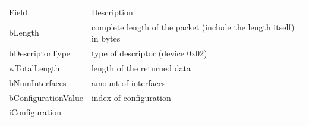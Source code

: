 \begin{longtable}[]{@{}ll@{}}
\toprule
\begin{minipage}[t]{0.47\columnwidth}\raggedright\strut
{Field}
\strut\end{minipage} &
\begin{minipage}[t]{0.47\columnwidth}\raggedright\strut
{Description}
\strut\end{minipage}\tabularnewline
\begin{minipage}[t]{0.47\columnwidth}\raggedright\strut
{bLength}
\strut\end{minipage} &
\begin{minipage}[t]{0.47\columnwidth}\raggedright\strut
{complete length of the packet (include the length itself) in bytes}
\strut\end{minipage}\tabularnewline
\begin{minipage}[t]{0.47\columnwidth}\raggedright\strut
{bDescriptorType}
\strut\end{minipage} &
\begin{minipage}[t]{0.47\columnwidth}\raggedright\strut
{type of descriptor (device 0x02)}
\strut\end{minipage}\tabularnewline
\begin{minipage}[t]{0.47\columnwidth}\raggedright\strut
{wTotalLength}
\strut\end{minipage} &
\begin{minipage}[t]{0.47\columnwidth}\raggedright\strut
{length of the returned data}
\strut\end{minipage}\tabularnewline
\begin{minipage}[t]{0.47\columnwidth}\raggedright\strut
{bNumInterfaces}
\strut\end{minipage} &
\begin{minipage}[t]{0.47\columnwidth}\raggedright\strut
{amount of interfaces}
\strut\end{minipage}\tabularnewline
\begin{minipage}[t]{0.47\columnwidth}\raggedright\strut
{bConfigurationValue}
\strut\end{minipage} &
\begin{minipage}[t]{0.47\columnwidth}\raggedright\strut
{index of configuration}
\strut\end{minipage}\tabularnewline
\begin{minipage}[t]{0.47\columnwidth}\raggedright\strut
{iConfiguration}
\strut\end{minipage} &
\begin{minipage}[t]{0.47\columnwidth}\raggedright\strut

\end{minipage}
\end{longtable}
